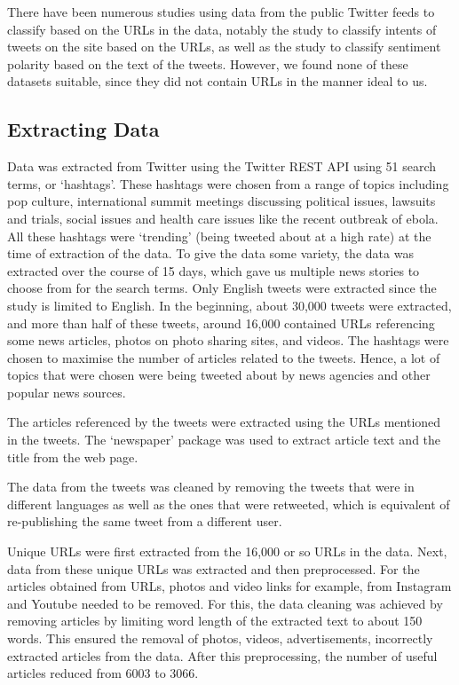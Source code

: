 \documentclass[11pt]{article}
\begin{document}
There have been numerous studies using data from the public Twitter feeds to classify based on the URLs in the data, notably the study to classify intents of tweets on the site based on the URLs, as well as the study to classify sentiment polarity based on the text of the tweets. However, we found none of these datasets suitable, since they did not contain URLs in the manner ideal to us.

\subsection{Extracting Data}

Data was extracted from Twitter using the Twitter REST API using 51 search terms, or ‘hashtags’. These hashtags were chosen from a range of topics including pop culture,  international summit meetings discussing political issues, lawsuits and trials, social issues and health care issues like the recent outbreak of ebola. All these hashtags were ‘trending’ (being tweeted about at a high rate) at the time of extraction of the data. To give the data some variety, the data was extracted over the course of 15 days, which gave us multiple news stories to choose from for the search terms. Only English tweets were extracted since the study is limited to English. In the beginning, about 30,000 tweets were extracted, and more than half of these tweets, around 16,000 contained URLs referencing some news articles, photos on photo sharing sites, and videos. The hashtags were chosen to maximise the number of articles related to the tweets. Hence, a lot of topics that were chosen were being tweeted about by news agencies and other popular news sources.

The articles referenced by the tweets were extracted using the URLs mentioned in the tweets. The ‘newspaper’ package was used to extract article text and the title from the web page.


The data from the tweets was cleaned by removing the tweets that were in different languages as well as the ones that were retweeted, which is equivalent of re-publishing the same tweet from a different user. 

Unique URLs were first extracted from the 16,000 or so URLs in the data. Next, data from these unique URLs was extracted and then preprocessed. For the articles obtained from URLs, photos and video links for example, from Instagram and Youtube needed to be removed. For this, the data cleaning was achieved by removing articles by limiting word length of the extracted text to about 150 words. This ensured the removal of photos, videos, advertisements, incorrectly extracted articles from the data.  After this preprocessing, the number of useful articles reduced from 6003 to 3066.
\end{document}
